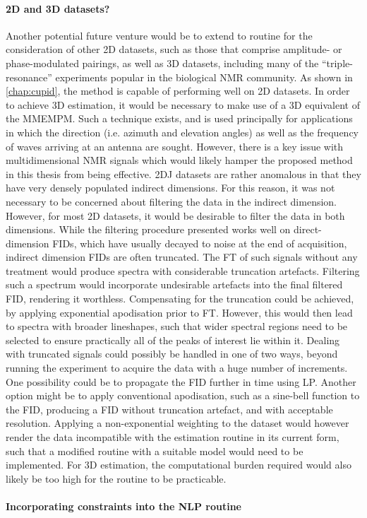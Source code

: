 \paragraph{\ac{2D} and \ac{3D} datasets?}
Another potential future venture would be to extend to routine for the
consideration of other \ac{2D} datasets, such as those that comprise
amplitude- or phase-modulated pairings, as well as \ac{3D} datasets,
including many of the ``triple-resonance'' experiments popular in the
biological \ac{NMR} community\cite[Section 7.4]{Cavanagh2007}. As shown in
\cref{chap:cupid}, the method is capable of performing well on \ac{2D}
datasets. In order to achieve \ac{3D} estimation, it would be necessary to
make use of a \ac{3D} equivalent of the \ac{MMEMPM}. Such a technique exists,
and is used principally for applications in which the direction (i.e. azimuth
and elevation angles) as well as the frequency of waves arriving at an antenna
are sought\cite{Yilmazer2006}. However, there is a key issue with
multidimensional \ac{NMR} signals which would likely hamper the proposed method
in this thesis from being effective. \ac{2DJ} datasets are rather anomalous in
that they have very densely populated indirect dimensions. For this reason, it
was not necessary to be concerned about filtering the data in the indirect
dimension. However, for most \ac{2D} datasets, it would be desirable to filter
the data in both dimensions. While the filtering procedure presented works well
on direct-dimension \acp{FID}, which have usually decayed to noise at the end
of acquisition, indirect dimension \acp{FID} are often truncated. The \ac{FT}
of such signals without any treatment would produce spectra with considerable
truncation artefacts. Filtering such a spectrum would incorporate undesirable
artefacts into the final filtered \ac{FID}, rendering it worthless.
Compensating for the truncation could be achieved, by applying exponential
apodisation prior to \ac{FT}. However, this would then lead to spectra with
broader lineshapes, such that wider spectral regions need to be selected to
ensure practically all of the peaks of interest lie within it. Dealing with
truncated signals could possibly be handled in one of two ways, beyond running
the experiment to acquire the data with a huge number of increments. One
possibility could be to propagate the \ac{FID} further in time using \ac{LP}.
Another option might be to apply conventional apodisation, such as a sine-bell
function to the \ac{FID}, producing a \ac{FID} without truncation artefact, and
with acceptable resolution. Applying a non-exponential weighting to the dataset
would however render the data incompatible with the estimation routine in its
current form, such that a modified routine with a suitable model would need to
be implemented. For \ac{3D} estimation, the computational burden required would
also likely be too high for the routine to be practicable. 

\paragraph{Incorporating constraints into the \ac{NLP} routine}
